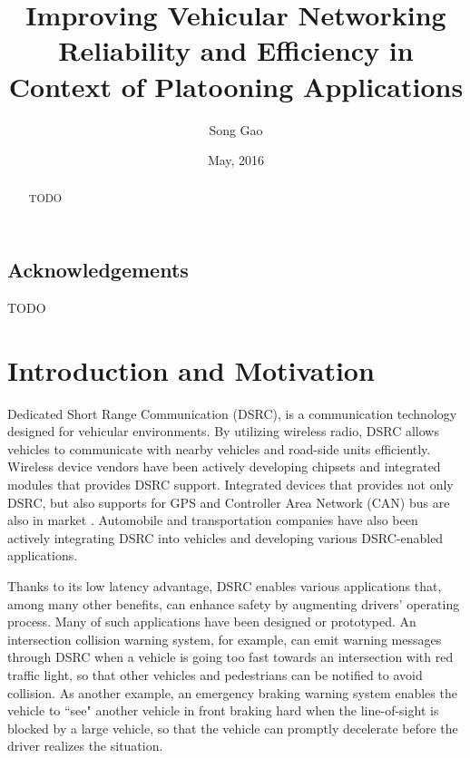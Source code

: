 \documentclass[12pt]{report}
\title{Improving Vehicular Networking Reliability and Efficiency in Context of Platooning Applications}
\author{Song Gao}
\date{May, 2016} %
\begin{document}
\begin{romanpages}      %

\TitlePage

\chapter*{Acknowledgements}
%

TODO

\begin{abstract} 
  TODO
\end{abstract}

\tableofcontents
\listoffigures
\listoftables

\printnomenclature[1.0in] %
\end{romanpages}        %


\normalem       %

\chapter{Introduction and Motivation}
Dedicated Short Range Communication (DSRC), is a communication technology designed for vehicular environments. By utilizing wireless radio, DSRC allows vehicles to communicate with nearby vehicles and road-side units efficiently. Wireless device vendors have been actively developing chipsets and integrated modules that provides DSRC support. Integrated devices that provides not only DSRC, but also supports for GPS and Controller Area Network (CAN) bus are also in market \cite{aradasystems,denso,unex}. Automobile and transportation companies have also been actively integrating DSRC into vehicles and developing various DSRC-enabled applications.

Thanks to its low latency advantage, DSRC enables various applications that, among many other benefits, can enhance safety by augmenting drivers' operating process. Many of such applications have been designed or prototyped. An intersection collision warning system, for example, can emit warning messages through DSRC when a vehicle is going too fast towards an intersection with red traffic light, so that other vehicles and pedestrians can be notified to avoid collision. As another example, an emergency braking warning system enables the vehicle to ``see" another vehicle in front braking hard when the line-of-sight is blocked by a large vehicle, so that the vehicle can promptly decelerate before the driver realizes the situation.
\end{document}
